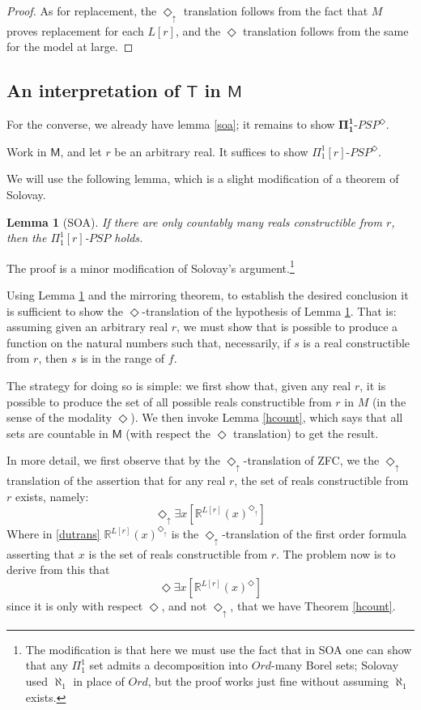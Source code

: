\documentclass{article}
\newtheorem{Lemma}[Theorem]{Lemma}
\theoremstyle{definition}
\newcommand{\du}{\Diamond_\uparrow}
\begin{document}
\begin{proof}
    As for replacement, the $\du$ translation follows from the fact that $M$ proves replacement for 
    each $L[r]$, and the $\Diamond$ translation follows from the same for the model at large.
    

\end{proof}


\subsection{An interpretation of $\mathsf{T}$ in $\mathsf{M}$}
For the converse, we already have lemma \ref{soa}; 
it remains to show $\mathbf{\Pi^1_1}$-$PSP^\Diamond$. 

Work in $\mathsf{M}$, and let $r$ be an arbitrary real. It suffices to show
$\Pi_1^1[r]$-$PSP^\Diamond$. 

We will use the following lemma, which is a slight modification of a theorem of Solovay.
\begin{Lemma}[SOA]\label{sol}
    If there are only countably many reals constructible from $r$, then the $\Pi_1^1[r]$-$PSP$ holds.
\end{Lemma}
The proof is a minor modification of Solovay's argument.\footnote{The modification is that 
here we must use the fact that in SOA one can show 
that any $\Pi_1^1$ set admits a decomposition into $Ord$-many Borel sets; Solovay used $\aleph_1$ 
in place of $Ord$, but the proof works just fine without assuming $\aleph_1$ exists.} 

Using Lemma \ref{sol} and the mirroring theorem, to establish 
the desired conclusion it is sufficient to show the $\Diamond$-translation 
of the hypothesis of Lemma \ref{sol}. That is: assuming given an arbitrary real $r$, 
we must show that is possible to produce a function on the natural numbers such that, 
necessarily, if $s$ is a real constructible from $r$, 
then $s$ is in the range of $f$.

The strategy for doing so is simple: we first show that, given any real $r$, 
it is possible to produce the set of all possible reals constructible from $r$ in 
$M$ (in the sense of the modality $\Diamond$). We then invoke Lemma \ref{hcount}, which 
says that all sets are countable in $\mathsf{M}$ (with respect the $\Diamond$ translation)
to get the result.

In more detail,
we first observe that by the $\du$-translation of ZFC, 
we the $\du$ translation of the assertion that for any real $r$, the 
set of reals constructible from $r$ exists, namely:
\begin{equation}\label{dutrans}
    \du \exists x [\mathbb{R}^{L[r]}(x)^{\du}]
\end{equation}
Where in \eqref{dutrans} $\mathbb{R}^{L[r]}(x)^{\du}$ is the $\du$-translation of the first order 
formula asserting that $x$ 
is the set of reals constructible from $r$. The problem now is to derive from this 
that 
\begin{equation}\label{dtrans}
    \Diamond \exists x [\mathbb{R}^{L[r]}(x)^{\Diamond}]
\end{equation}
since it is only with respect $\Diamond$, and not $\du$, that we have Theorem \ref{hcount}.
\end{document}
